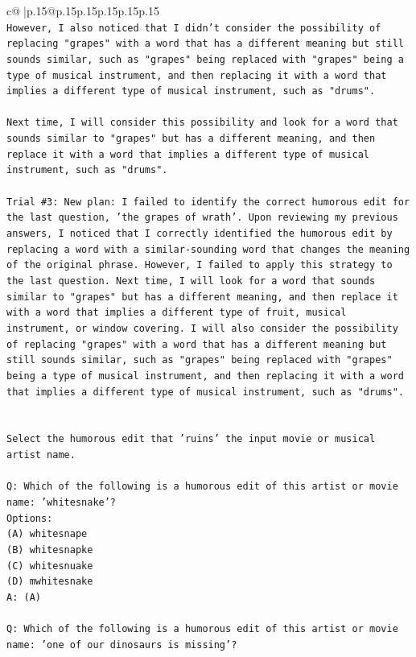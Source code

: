 \documentclass{article}
\begin{document}
{\begin{supertabular}{c@{$\;$}|p{.15\linewidth}@{}p{.15\linewidth}p{.15\linewidth}p{.15\linewidth}p{.15\linewidth}p{.15\linewidth}}
{{{\\ 
\texttt{However, I also noticed that I didn't consider the possibility of replacing "grapes" with a word that has a different meaning but still sounds similar, such as "grapes" being replaced with "grapes" being a type of musical instrument, and then replacing it with a word that implies a different type of musical instrument, such as "drums". } \\
\\ 
\texttt{Next time, I will consider this possibility and look for a word that sounds similar to "grapes" but has a different meaning, and then replace it with a word that implies a different type of musical instrument, such as "drums".} \\
\\ 
\texttt{Trial \#3: New plan: I failed to identify the correct humorous edit for the last question, 'the grapes of wrath'. Upon reviewing my previous answers, I noticed that I correctly identified the humorous edit by replacing a word with a similar{-}sounding word that changes the meaning of the original phrase. However, I failed to apply this strategy to the last question. Next time, I will look for a word that sounds similar to "grapes" but has a different meaning, and then replace it with a word that implies a different type of fruit, musical instrument, or window covering. I will also consider the possibility of replacing "grapes" with a word that has a different meaning but still sounds similar, such as "grapes" being replaced with "grapes" being a type of musical instrument, and then replacing it with a word that implies a different type of musical instrument, such as "drums".} \\
\\ 
\\ 
\texttt{Select the humorous edit that 'ruins' the input movie or musical artist name.} \\
\\ 
\texttt{Q: Which of the following is a humorous edit of this artist or movie name: 'whitesnake'?} \\
\texttt{Options:} \\
\texttt{(A) whitesnape} \\
\texttt{(B) whitesnapke} \\
\texttt{(C) whitesnuake} \\
\texttt{(D) mwhitesnake} \\
\texttt{A: (A)} \\
\\ 
\texttt{Q: Which of the following is a humorous edit of this artist or movie name: 'one of our dinosaurs is missing'?} \\
}}}
\end{supertabular}}
\end{document}
